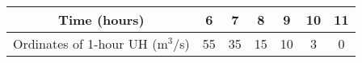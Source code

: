 \begin{tabular}{|c|c|c|c|c|c|c|}
\hline
Time (hours) & 6 & 7 & 8 & 9 & 10 & 11 \\
\hline
Ordinates of 1-hour UH (m$^3$/s) & 55 & 35 & 15 & 10 & 3 & 0 \\
\hline
\end{tabular}

